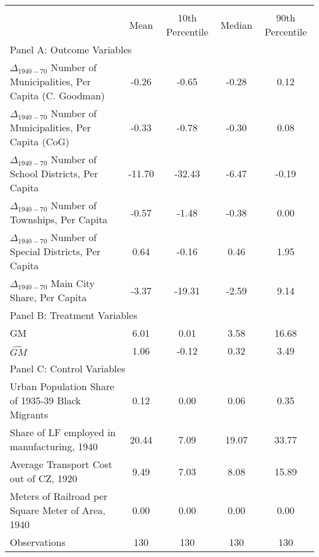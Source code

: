  \begin{tabular}{l*{4}{c}} \toprule
                &\multicolumn{4}{c}{}                   \\
                &     Mean&10th Percentile&   Median&90th Percentile\\
\cmidrule(lr){1-5}
\multicolumn{5}{l}{Panel A: Outcome Variables}\\
\cmidrule(lr){1-5}
$\Delta_{1940-70}$ Number of Municipalities, Per Capita (C. Goodman)&    -0.26&    -0.65&    -0.28&     0.12\\
$\Delta_{1940-70}$ Number of Municipalities, Per Capita (CoG)&    -0.33&    -0.78&    -0.30&     0.08\\
$\Delta_{1940-70}$ Number of School Districts, Per Capita&   -11.70&   -32.43&    -6.47&    -0.19\\
$\Delta_{1940-70}$ Number of Townships, Per Capita&    -0.57&    -1.48&    -0.38&     0.00\\
$\Delta_{1940-70}$ Number of Special Districts, Per Capita&     0.64&    -0.16&     0.46&     1.95\\
$\Delta_{1940-70}$ Main City Share, Per Capita&    -3.37&   -19.31&    -2.59&     9.14\\
\cmidrule(lr){1-5}
\multicolumn{5}{l}{Panel B: Treatment Variables}\\
\cmidrule(lr){1-5}
GM              &     6.01&     0.01&     3.58&    16.68\\
$\widehat{GM}$  &     1.06&    -0.12&     0.32&     3.49\\
\cmidrule(lr){1-5}
\multicolumn{5}{l}{Panel C: Control Variables}\\
\cmidrule(lr){1-5}
Urban Population Share of 1935-39 Black Migrants&     0.12&     0.00&     0.06&     0.35\\
Share of LF employed in manufacturing, 1940&    20.44&     7.09&    19.07&    33.77\\
Average Transport Cost out of CZ, 1920&     9.49&     7.03&     8.08&    15.89\\
Meters of Railroad per Square Meter of Area, 1940&     0.00&     0.00&     0.00&     0.00\\
\midrule Observations    &      130   &      130   &      130   &      130   \\    \bottomrule \end{tabular}
